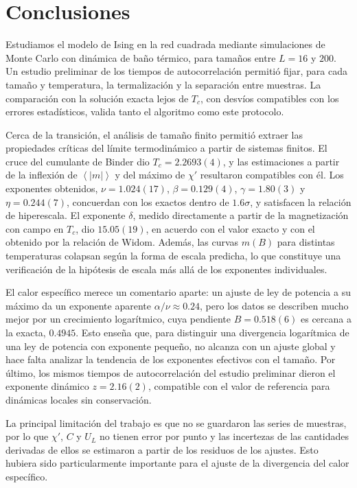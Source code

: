 \documentclass[a4paper,11pt]{article}
\newcommand{\expval}[1]{\left\langle #1 \right\rangle}
\newcommand{\Tc}{T_c}
\begin{document}
\section{Conclusiones}
Estudiamos el modelo de Ising en la red cuadrada mediante simulaciones de Monte Carlo con dinámica de baño térmico, para tamaños entre $L = 16$ y $200$.
Un estudio preliminar de los tiempos de autocorrelación permitió fijar, para cada tamaño y temperatura, la termalización y la separación entre muestras.
La comparación con la solución exacta lejos de $\Tc$, con desvíos compatibles con los errores estadísticos, valida tanto el algoritmo como este protocolo.

Cerca de la transición, el análisis de tamaño finito permitió extraer las propiedades críticas del límite termodinámico a partir de sistemas finitos.
El cruce del cumulante de Binder dio $\Tc = 2.2693(4)$, y las estimaciones a partir de la inflexión de $\expval{|m|}$ y del máximo de $\chi'$ resultaron compatibles con él.
Los exponentes obtenidos, $\nu = 1.024(17)$, $\beta = 0.129(4)$, $\gamma = 1.80(3)$ y $\eta = 0.244(7)$, concuerdan con los exactos dentro de $1.6\sigma$, y satisfacen la relación de hiperescala.
El exponente $\delta$, medido directamente a partir de la magnetización con campo en $\Tc$, dio $15.05(19)$, en acuerdo con el valor exacto y con el obtenido por la relación de Widom.
Además, las curvas $m(B)$ para distintas temperaturas colapsan según la forma de escala predicha, lo que constituye una verificación de la hipótesis de escala más allá de los exponentes individuales.

El calor específico merece un comentario aparte: un ajuste de ley de potencia a su máximo da un exponente aparente $\alpha/\nu \approx 0.24$, pero los datos se describen mucho mejor por un crecimiento logarítmico, cuya pendiente $B = 0.518(6)$ es cercana a la exacta, $0.4945$.
Esto enseña que, para distinguir una divergencia logarítmica de una ley de potencia con exponente pequeño, no alcanza con un ajuste global y hace falta analizar la tendencia de los exponentes efectivos con el tamaño.
Por último, los mismos tiempos de autocorrelación del estudio preliminar dieron el exponente dinámico $z = 2.16(2)$, compatible con el valor de referencia para dinámicas locales sin conservación.

La principal limitación del trabajo es que no se guardaron las series de muestras, por lo que $\chi'$, $C$ y $U_L$ no tienen error por punto y las incertezas de las cantidades derivadas de ellos se estimaron a partir de los residuos de los ajustes.
Esto hubiera sido particularmente importante para el ajuste de la divergencia del calor específico.
\printbibliography
\end{document}
